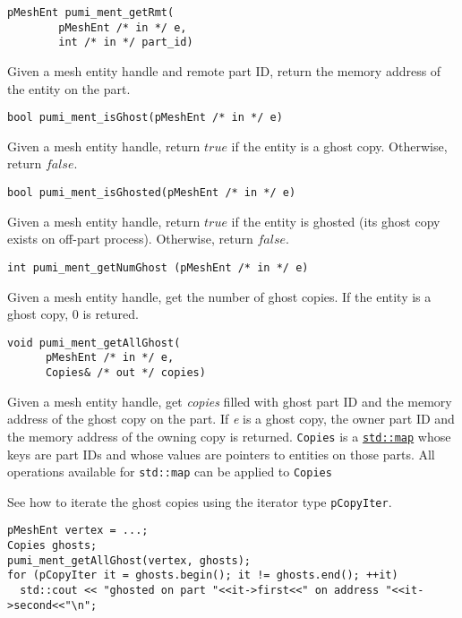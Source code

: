 \begin{verbatim}
pMeshEnt pumi_ment_getRmt(
        pMeshEnt /* in */ e, 
        int /* in */ part_id)
\end{verbatim}\vspace{-.5cm}\hspace{1cm}        
        Given a mesh entity handle and remote part ID, return the memory address of the entity on the part.

\begin{verbatim}
bool pumi_ment_isGhost(pMeshEnt /* in */ e)
\end{verbatim}\vspace{-.5cm}\hspace{1cm}
        Given a mesh entity handle, return $true$ if the entity is a ghost copy. Otherwise, return $false$.

\begin{verbatim}
bool pumi_ment_isGhosted(pMeshEnt /* in */ e)
\end{verbatim}\vspace{-.5cm}\hspace{1cm}
        Given a mesh entity handle, return $true$ if the entity is ghosted (its ghost copy exists on off-part process). Otherwise, return $false$.

\begin{verbatim}
int pumi_ment_getNumGhost (pMeshEnt /* in */ e)
\end{verbatim}\vspace{-.5cm}\hspace{1cm}
	Given a mesh entity handle, get the number of ghost copies. If the entity is a ghost copy, $0$ is retured.

\begin{verbatim}
void pumi_ment_getAllGhost(
      pMeshEnt /* in */ e, 
      Copies& /* out */ copies)
\end{verbatim}\vspace{-.5cm}\hspace{1cm}
	Given a mesh entity handle, get \emph{copies} filled with ghost part ID and the memory address of the ghost copy on the part. If \emph{e} is a ghost copy, the owner part ID and the memory address of the owning copy is returned. \texttt{Copies} is a \href{http://www.cplusplus.com/reference/map/map/}{\texttt{std::map}}
whose keys are part IDs and whose values are pointers to entities on those parts.  All operations available for \texttt{std::map} can be applied to \texttt{Copies}

See how to iterate the ghost copies using the iterator type \texttt{pCopyIter}.
\begin{verbatim}
pMeshEnt vertex = ...;
Copies ghosts;
pumi_ment_getAllGhost(vertex, ghosts);
for (pCopyIter it = ghosts.begin(); it != ghosts.end(); ++it)
  std::cout << "ghosted on part "<<it->first<<" on address "<<it->second<<"\n";
\end{verbatim}\vspace{-.5cm}\hspace{1cm}

